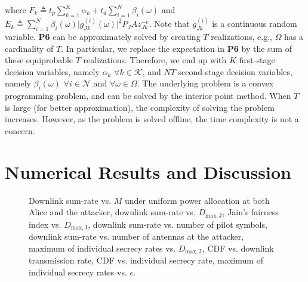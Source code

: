 \documentclass[draftclsnofoot, 12pt, onecolumn, journal]{IEEEtran}
\begin{document}
% 
where $F_k \triangleq t_p \sum_{k = 1}^K \alpha_k + t_d \sum_{i = 1}^N \beta_i(\omega)$ and $E_{k} \triangleq  \sum_{i = 1}^N \beta_i(\omega) \vert g_{Jk}^{(i)}(\omega) \vert^2 P_J A z_{Jk}^{-e}$.
Note that $g_{Jk}^{(i)}$ is a continuous random variable.
\textbf{P6} can be approximately solved by creating $T$ realizations, e.g., $\Omega$ has a cardinality of $T$.
In particular, we replace the expectation in \textbf{P6} by the sum of these equiprobable $T$ realizations.
Therefore, we end up with $K$ first-stage decision variables, namely $\alpha_k$ $\forall k \in \mathcal{K}$, and $N T$ second-stage decision variables, namely $\beta_i(\omega)$ $\forall i \in \mathcal{N}$ and $\forall \omega \in \Omega$.
The underlying problem is a convex programming problem, and can be solved by the interior point method.
When $T$ is large (for better approximation), the complexity of solving the problem increases. 
However, as the problem is solved offline, the time complexity is not a concern.


\section{Numerical Results and Discussion}
\label{sec:numerical}

%
\begin{figure*}[!t]
\centering
{}
\hfil
{}
\hfil
{}
\vfil
{}
\hfil
{}
\hfil
{}
\vfil
{}
\hfil
{}
\hfil
{}
\caption{ Downlink sum-rate vs. $M$ under uniform power allocation at both Alice and the attacker,  downlink sum-rate vs. $D_{\mathrm{max,J}}$,  Jain's fairness index vs. $D_{\mathrm{max,J}}$,  downlink sum-rate vs. number of pilot symbols,   downlink sum-rate vs. number of antennas at the attacker,  maximum of individual secrecy rates vs. $D_{\mathrm{max,J}}$,  CDF vs. downlink transmission rate,  CDF vs. individual secrecy rate,  maximum of individual secrecy rates vs. $\epsilon$.}
\label{fig:4}
\end{figure*}
%
\end{document}
